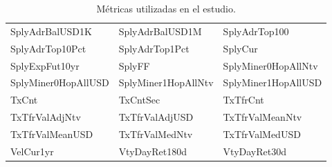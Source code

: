 \begin{table}[ht]
\begin{tabular}{p{5cm} p{5cm} p{5cm}}
		SplyAdrBalUSD1K & SplyAdrBalUSD1M &
		SplyAdrTop100 \\
		
		SplyAdrTop10Pct &
		SplyAdrTop1Pct & SplyCur \\
		
		SplyExpFut10yr & SplyFF &
		SplyMiner0HopAllNtv \\
		
		SplyMiner0HopAllUSD &
		SplyMiner1HopAllNtv & SplyMiner1HopAllUSD \\
		
		TxCnt & TxCntSec &
		TxTfrCnt \\
		
		TxTfrValAdjNtv &
		TxTfrValAdjUSD & TxTfrValMeanNtv \\
		
		TxTfrValMeanUSD & TxTfrValMedNtv &
		TxTfrValMedUSD \\
		
		VelCur1yr &
		VtyDayRet180d & VtyDayRet30d\\
		\bottomrule
		\end{tabular}
	\caption{Métricas utilizadas en el estudio.}
	\label{tab:Table14}
\end{table}




